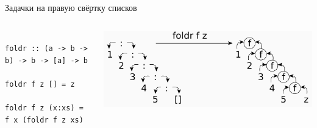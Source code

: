     \begin{frame}[fragile]{Задачки на правую свёртку списков}
        \vspace{-1em}
        \begin{columns}[onlytextwidth]
            \begin{column}{0.485\textwidth}
                \begin{verbatim}
                    foldr :: (a -> b -> b) -> b -> [a] -> b
                    foldr f z [] = z
                    foldr f z (x:xs) = f x (foldr f z xs)
                \end{verbatim}
            \end{column}\hfill%
            \begin{column}{0.5\textwidth}
                \begin{center}
                    \includegraphics[width=1\textwidth]{figs/foldr}
                \end{center}
            \end{column}
        \end{columns}
    \end{frame}


